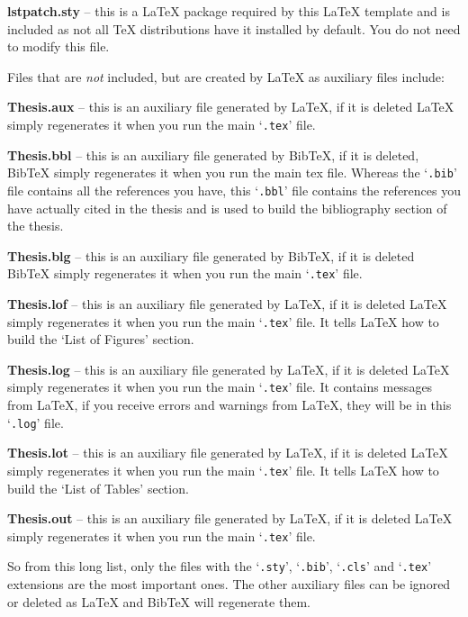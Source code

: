 \textbf{lstpatch.sty} -- this is a \LaTeX{} package required by this LaTeX template and is included as not all \TeX{} distributions have it installed by default. You do not need to modify this file.

Files that are \emph{not} included, but are created by \LaTeX{} as auxiliary files include:

\textbf{Thesis.aux} -- this is an auxiliary file generated by \LaTeX{}, if it is deleted \LaTeX{} simply regenerates it when you run the main `\texttt{.tex}' file.

\textbf{Thesis.bbl} -- this is an auxiliary file generated by BibTeX, if it is deleted, BibTeX simply regenerates it when you run the main tex file. Whereas the `\texttt{.bib}' file contains all the references you have, this `\texttt{.bbl}' file contains the references you have actually cited in the thesis and is used to build the bibliography section of the thesis.

\textbf{Thesis.blg} -- this is an auxiliary file generated by BibTeX, if it is deleted BibTeX simply regenerates it when you run the main `\texttt{.tex}' file.

\textbf{Thesis.lof} -- this is an auxiliary file generated by \LaTeX{}, if it is deleted \LaTeX{} simply regenerates it when you run the main `\texttt{.tex}' file. It tells \LaTeX{} how to build the `List of Figures' section.

\textbf{Thesis.log} -- this is an auxiliary file generated by \LaTeX{}, if it is deleted \LaTeX{} simply regenerates it when you run the main `\texttt{.tex}' file. It contains messages from \LaTeX{}, if you receive errors and warnings from \LaTeX{}, they will be in this `\texttt{.log}' file.

\textbf{Thesis.lot} -- this is an auxiliary file generated by \LaTeX{}, if it is deleted \LaTeX{} simply regenerates it when you run the main `\texttt{.tex}' file. It tells \LaTeX{} how to build the `List of Tables' section.

\textbf{Thesis.out} -- this is an auxiliary file generated by \LaTeX{}, if it is deleted \LaTeX{} simply regenerates it when you run the main `\texttt{.tex}' file.


So from this long list, only the files with the `\texttt{.sty}', `\texttt{.bib}', `\texttt{.cls}' and `\texttt{.tex}' extensions are the most important ones. The other auxiliary files can be ignored or deleted as \LaTeX{} and BibTeX will regenerate them.


